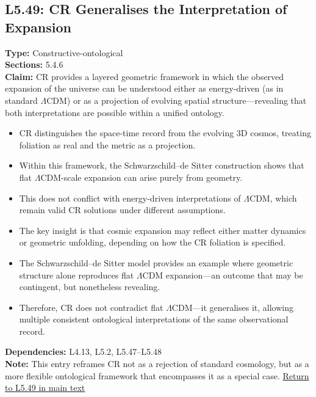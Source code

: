 \documentclass[12pt]{book}
\newcommand{\returnlink}[1]{\hyperref[logic:#1]{Return to #1 in main text}\xspace}
\begin{document}
\subsection*{L5.49: CR Generalises the Interpretation of Expansion}
\label{appendix:L5.49}
\textbf{Type:} Constructive-ontological \\
\textbf{Sections:} 5.4.6 \\
\textbf{Claim:} CR provides a layered geometric framework in which the observed expansion of the universe can be understood either as energy-driven (as in standard $\Lambda$CDM) or as a projection of evolving spatial structure---revealing that both interpretations are possible within a unified ontology.
\begin{itemize}
  \item CR distinguishes the space-time record from the evolving 3D cosmos, treating foliation as real and the metric as a projection.
  \item Within this framework, the Schwarzschild–de Sitter construction shows that flat $\Lambda$CDM-scale expansion can arise purely from geometry.
  \item This does not conflict with energy-driven interpretations of $\Lambda$CDM, which remain valid CR solutions under different assumptions.
  \item The key insight is that cosmic expansion may reflect either matter dynamics or geometric unfolding, depending on how the CR foliation is specified.
  \item The Schwarzschild–de Sitter model provides an example where geometric structure alone reproduces flat $\Lambda$CDM expansion---an outcome that may be contingent, but nonetheless revealing.
  \item Therefore, CR does not contradict flat $\Lambda$CDM---it generalises it, allowing multiple consistent ontological interpretations of the same observational record.
\end{itemize}
\textbf{Dependencies:} L4.13, L5.2, L5.47–L5.48 \\
\textbf{Note:} This entry reframes CR not as a rejection of standard cosmology, but as a more flexible ontological framework that encompasses it as a special case.
\returnlink{L5.49}
\end{document}
